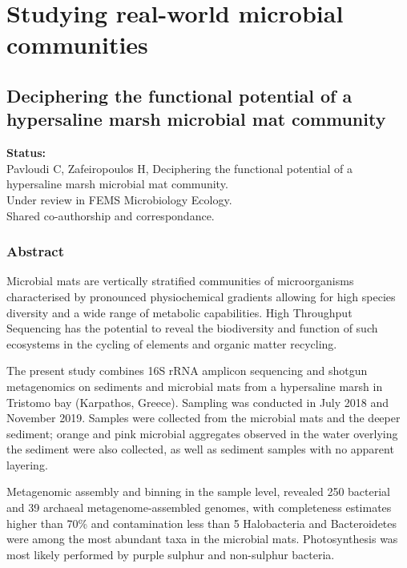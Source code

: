 % 
% 

\chapter{
    Studying real-world microbial communities
}
\label{cha:swamp}


\section{
   Deciphering the functional potential of a hypersaline marsh microbial mat community
}
\label{publ:tristomo-ecology}

\textbf{Status:} \\ 
   Pavloudi C, Zafeiropoulos H, 
   Deciphering the functional potential of a hypersaline marsh microbial mat community.\\
   Under review in FEMS Microbiology Ecology. \\ 
   Shared co-authorship and correspondance.


\subsection{Abstract}

   Microbial mats are vertically stratified communities of microorganisms characterised by 
   pronounced physiochemical gradients allowing for high species diversity 
   and a wide range of metabolic capabilities. 
   High Throughput Sequencing has the potential to reveal the biodiversity and function of such ecosystems 
   in the cycling of elements and organic matter recycling.

   The present study combines 16S rRNA amplicon sequencing and shotgun metagenomics 
   on sediments and microbial mats from a hypersaline marsh in Tristomo bay 
   (Karpathos, Greece). 
   Sampling was conducted in July 2018 and November 2019. 
   Samples were collected from the microbial mats and the deeper sediment; 
   orange and pink microbial aggregates observed in the water overlying the 
   sediment were also collected, as well as sediment samples with no apparent layering.

   Metagenomic assembly and binning in the sample level, revealed 250 bacterial 
   and 39 archaeal metagenome-assembled genomes, 
   with completeness estimates higher than 70\%  and contamination less than 5%
   Halobacteria and Bacteroidetes were among the most abundant taxa in the microbial mats. 
   Photosynthesis was most likely performed by purple sulphur and non-sulphur bacteria. 
   
